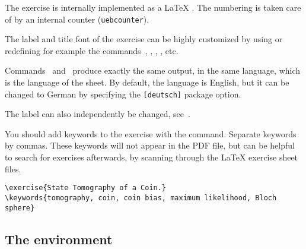 \documentclass[11pt,a4paper]{article}
\begin{document}
The exercise is internally implemented as a \LaTeX{} . The numbering is
taken care of by an internal counter (\texttt{uebcounter}).

The label and title font of the exercise can be highly customized by using or redefining
for example the commands~, ,
, , etc.


\begin{pkgnotice}
  Commands~ and~ produce exactly the same output, in
  the same language, which is the language of the sheet. By default, the language is
  English, but it can be changed to German by specifying the \texttt{[deutsch]} package
  option.

  The label can also independently be changed, see~.
\end{pkgnotice}

You should add keywords to the exercise with the  command. Separate
keywords by commas. These keywords will not appear in the PDF file, but can be helpful to
search for exercises afterwards, by scanning through the \LaTeX{} exercise sheet files.
\begin{pkgverbatim}
\begin{verbatim}
\exercise{State Tomography of a Coin.}
\keywords{tomography, coin, coin bias, maximum likelihood, Bloch sphere}
\end{verbatim}
\end{pkgverbatim}





\subsection{The  environment}

\end{document}

